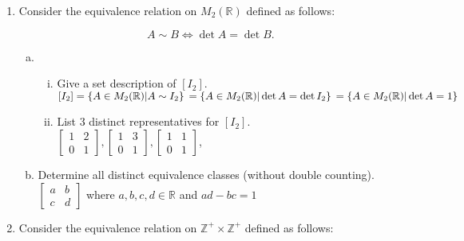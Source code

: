 \documentclass[12pt]{amsart}
\begin{document}
\vspace{0.3in}
\begin{enumerate}[{\bfseries 1.}]
\addtocounter{enumi}{3}
\item Consider the equivalence relation on $M_{2}(\mathbb{R})$ defined as follows:

	$$A\sim B\Longleftrightarrow \det{A}=\det{B}.$$

	\begin{enumerate}[(a)]
	\item\begin{enumerate}[(i)]
		\vspace{0.2in}
		\item Give a set description of $[I_{2}]$.
			\\$[I_{2}] =  \left\{A \in M_{2}(\mathbb{R})|A \sim I_{2}\right\}
			\\=  \left\{A \in M_{2}(\mathbb{R})|\det{A}=\det{I_{2}}\right\}
			\\=  \left\{A \in M_{2}(\mathbb{R})|\det{A}=1 \right\}$
		\vspace{0.1in}
		\item List 3 distinct representatives for $[I_{2}]$.
		\\
			 $\begin{bmatrix}
    			1 & 2 \\
    			0 & 1 
			 \end{bmatrix}, 
			 \begin{bmatrix}
    			1 & 3 \\
    			0 & 1 
			 \end{bmatrix},
			 \begin{bmatrix}
    			1 & 1 \\
    			0 & 1 
			 \end{bmatrix}$,
		\end{enumerate}
	\vspace{0.1in}
	\item Determine all distinct equivalence classes (without double counting).
		\\$\begin{bmatrix}
    		a & b \\
    		c & d 
    	 \end{bmatrix}$ where $a,b,c,d\in\mathbb{R}$ and $ad - bc = 1$
	\end{enumerate}

\vspace{0.2in}
\item Consider the equivalence relation on $\mathbb{Z}^{+}\times\mathbb{Z}^{+}$ defined as follows:


\end{enumerate}
\end{document}

